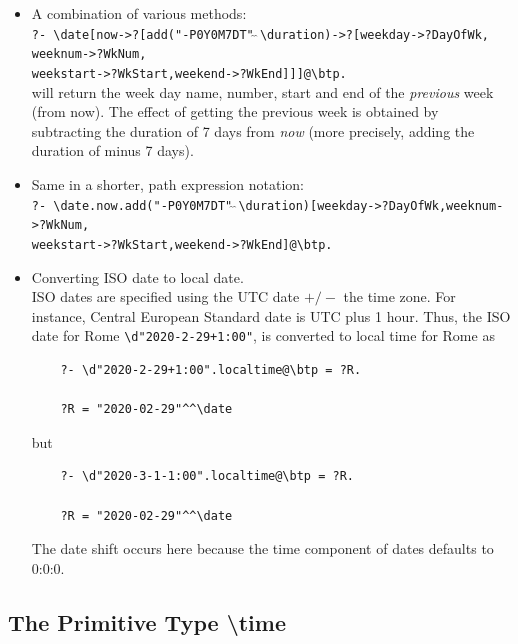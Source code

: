 \documentclass[11pt]{article}
\newcommand{\bs}{\textbackslash}
\begin{document}
\begin{itemize}
    \verb|?WkNum = 11|\\
    \verb|?WkStart = "2021-03-07"^^\date|\\
    \verb|?WkEnd = "2021-03-13"^^\date|
  \item A combination of various methods:\\
    \texttt{?- \bs{}date[now->?[add("-P0Y0M7DT"$\hat{~}\hat{~}$\bs{}duration)->?[weekday->?DayOfWk,\\
      \hspace*{45mm}weeknum->?WkNum,\\
      \hspace*{45mm}weekstart->?WkStart,weekend->?WkEnd]]]@\bs{}btp.}
    \\
    will return the week day name, number, start and end of the \emph{previous}
    week (from now).
    The effect of getting the previous week is obtained by subtracting the
    duration of 7 days from \emph{now} (more precisely, adding the duration
    of minus 7 days).
  \item Same in a shorter, path expression notation:\\
    \texttt{?- \bs{}date.now.add("-P0Y0M7DT"$\hat{~}\hat{~}$\bs{}duration)[weekday->?DayOfWk,weeknum->?WkNum,\\
    \hspace*{70mm}weekstart->?WkStart,weekend->?WkEnd]@\bs{}btp.}
  \item Converting ISO date to local date.
    \\
    ISO dates are specified using
    the UTC date $+/-$ the time zone. For instance, Central European Standard
    date is UTC plus 1 
    hour. Thus, the ISO date for
    Rome
    \texttt{\bs{}d"2020-2-29+1:00"},
    is converted to local time for Rome as
\begin{verbatim}
    ?- \d"2020-2-29+1:00".localtime@\btp = ?R.

    ?R = "2020-02-29"^^\date
\end{verbatim}
    but
\begin{verbatim}
    ?- \d"2020-3-1-1:00".localtime@\btp = ?R.

    ?R = "2020-02-29"^^\date
\end{verbatim}
    The date shift occurs here because the time component of dates defaults
    to 0:0:0.
\end{itemize}

\subsection{ The Primitive Type \bs{}time}
\end{document}

